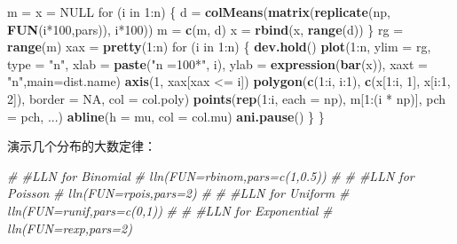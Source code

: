 \documentclass[]{article}
\newenvironment{Shaded}{\begin{snugshade}}{\end{snugshade}}
\newcommand{\KeywordTok}[1]{\textcolor[rgb]{0.13,0.29,0.53}{\textbf{{#1}}}}
\newcommand{\DataTypeTok}[1]{\textcolor[rgb]{0.13,0.29,0.53}{{#1}}}
\newcommand{\DecValTok}[1]{\textcolor[rgb]{0.00,0.00,0.81}{{#1}}}
\newcommand{\StringTok}[1]{\textcolor[rgb]{0.31,0.60,0.02}{{#1}}}
\newcommand{\CommentTok}[1]{\textcolor[rgb]{0.56,0.35,0.01}{\textit{{#1}}}}
\newcommand{\OtherTok}[1]{\textcolor[rgb]{0.56,0.35,0.01}{{#1}}}
\newcommand{\NormalTok}[1]{{#1}}
\begin{document}
\begin{Shaded}
\begin{Highlighting}[]
    \NormalTok{m =}\StringTok{ }\NormalTok{x =}\StringTok{ }\OtherTok{NULL}
    \NormalTok{for (i in }\DecValTok{1}\NormalTok{:n) \{}
        \NormalTok{d =}\StringTok{ }\KeywordTok{colMeans}\NormalTok{(}\KeywordTok{matrix}\NormalTok{(}\KeywordTok{replicate}\NormalTok{(np, }\KeywordTok{FUN}\NormalTok{(i*}\DecValTok{100}\NormalTok{,pars)), i*}\DecValTok{100}\NormalTok{))}
        \NormalTok{m =}\StringTok{ }\KeywordTok{c}\NormalTok{(m, d)}
        \NormalTok{x =}\StringTok{ }\KeywordTok{rbind}\NormalTok{(x, }\KeywordTok{range}\NormalTok{(d))}
    \NormalTok{\}}
    \NormalTok{rg =}\StringTok{ }\KeywordTok{range}\NormalTok{(m)}
    \NormalTok{xax =}\StringTok{ }\KeywordTok{pretty}\NormalTok{(}\DecValTok{1}\NormalTok{:n)}
    \NormalTok{for (i in }\DecValTok{1}\NormalTok{:n) \{}
        \KeywordTok{dev.hold}\NormalTok{()}
        \KeywordTok{plot}\NormalTok{(}\DecValTok{1}\NormalTok{:n, }\DataTypeTok{ylim =} \NormalTok{rg, }\DataTypeTok{type =} \StringTok{"n"}\NormalTok{,}
             \DataTypeTok{xlab =} \KeywordTok{paste}\NormalTok{(}\StringTok{"n =100*"}\NormalTok{, i), }
             \DataTypeTok{ylab =} \KeywordTok{expression}\NormalTok{(}\KeywordTok{bar}\NormalTok{(x)), }\DataTypeTok{xaxt =} \StringTok{"n"}\NormalTok{,}\DataTypeTok{main=}\NormalTok{dist.name)}
        \KeywordTok{axis}\NormalTok{(}\DecValTok{1}\NormalTok{, xax[xax <=}\StringTok{ }\NormalTok{i])}
        \KeywordTok{polygon}\NormalTok{(}\KeywordTok{c}\NormalTok{(}\DecValTok{1}\NormalTok{:i, i:}\DecValTok{1}\NormalTok{), }\KeywordTok{c}\NormalTok{(x[}\DecValTok{1}\NormalTok{:i, }\DecValTok{1}\NormalTok{], x[i:}\DecValTok{1}\NormalTok{, }\DecValTok{2}\NormalTok{]), }
                \DataTypeTok{border =} \OtherTok{NA}\NormalTok{, }\DataTypeTok{col =} \NormalTok{col.poly)}
        \KeywordTok{points}\NormalTok{(}\KeywordTok{rep}\NormalTok{(}\DecValTok{1}\NormalTok{:i, }\DataTypeTok{each =} \NormalTok{np), m[}\DecValTok{1}\NormalTok{:(i *}\StringTok{ }\NormalTok{np)], }\DataTypeTok{pch =} \NormalTok{pch, ...)}
        \KeywordTok{abline}\NormalTok{(}\DataTypeTok{h =} \NormalTok{mu, }\DataTypeTok{col =} \NormalTok{col.mu)}
        \KeywordTok{ani.pause}\NormalTok{()}
    \NormalTok{\}}
\NormalTok{\}}
\end{Highlighting}
\end{Shaded}

演示几个分布的大数定律：

\begin{Shaded}
\begin{Highlighting}[]
\CommentTok{# #LLN for Binomial}
\CommentTok{# lln(FUN=rbinom,pars=c(1,0.5))}
\CommentTok{# }
\CommentTok{# #LLN for Poisson}
\CommentTok{# lln(FUN=rpois,pars=2)}
\CommentTok{# }
\CommentTok{# #LLN for Uniform}
\CommentTok{# lln(FUN=runif,pars=c(0,1))}
\CommentTok{# }
\CommentTok{# #LLN for Exponential}
\CommentTok{# lln(FUN=rexp,pars=2)}
\end{Highlighting}
\end{Shaded}
\end{document}
